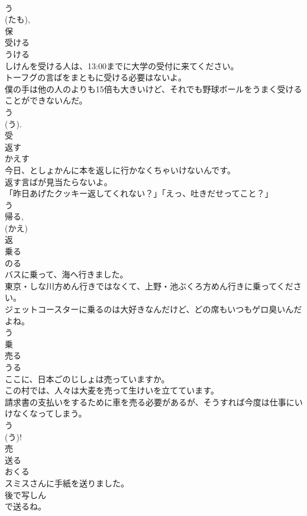 \documentclass[8pt]{extreport}
\begin{document}
\begin{CJK}{UTF8}{min}
\\	う 
\\	(たも), 
\\	保	
\\	受ける	
\\	うける	
\\	しけんを受ける人は、13:00までに大学の受付に来てください。	
\\	トーフグの言ばをまともに受ける必要はないよ。	
\\	僕の手は他の人のよりも15倍も大きいけど、それでも野球ボールをうまく受けることができないんだ。	
\\	う 
\\	(う). 
\\	受	
\\	返す	
\\	かえす	
\\	今日、としょかんに本を返しに行かなくちゃいけないんです。	
\\	返す言ばが見当たらないよ。	
\\	「昨日あげたクッキー返してくれない？」「えっ、吐きだせってこと？」	
\\	う 
\\	帰る, 
\\	(かえ) 
\\	返	
\\	乗る	
\\	のる	
\\	バスに乗って、海へ行きました。	
\\	東京・しな川方めん行きではなくて、上野・池ぶくろ方めん行きに乗ってください。	
\\	ジェットコースターに乗るのは大好きなんだけど、どの席もいつもゲロ臭いんだよね。	
\\	う 
\\	乗	
\\	売る	
\\	うる	
\\	ここに、日本ごのじしょは売っていますか。	
\\	この村では、人々は大麦を売って生けいを立てています。	
\\	請求書の支払いをするために車を売る必要があるが、そうすれば今度は仕事にいけなくなってしまう。	
\\	う 
\\	(う)! 
\\	売	
\\	送る	
\\	おくる	
\\	スミスさんに手紙を送りました。	
\\	後で写しん
\\	で送るね。	

\end{CJK}
\end{document}
